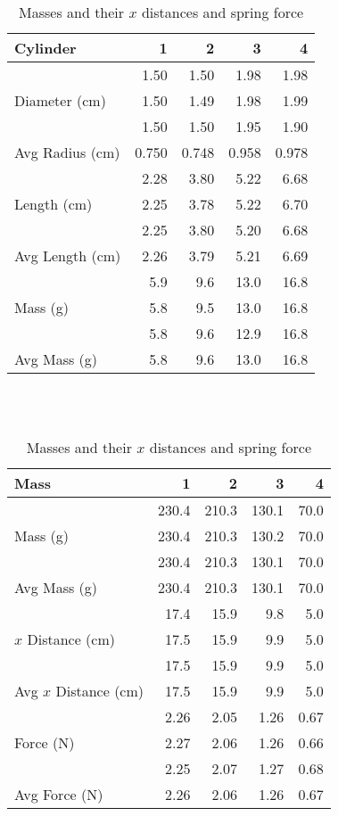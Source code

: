 \documentclass [12pt, letterpaper, twoside] {article}
\begin{document}
\begin{table}[H]
  \centering
  \begin {tabular}{|l | r | r | r | r|}
    \hline\hline
    Cylinder & 1 & 2 & 3 & 4 \\
    \hline
    \multirow {3}{*}{Diameter (cm)} & 1.50 & 1.50 & 1.98 & 1.98 \\
    & 1.50 & 1.49 & 1.98 & 1.99 \\
    & 1.50 & 1.50 & 1.95 & 1.90 \\
    \hline
    Avg Radius (cm) & 0.750 & 0.748 & 0.958 & 0.978 \\
    \hline
    \multirow {3}{*}{Length (cm)} & 2.28 & 3.80 & 5.22 & 6.68 \\
    & 2.25 & 3.78 & 5.22 & 6.70 \\
    & 2.25 & 3.80 & 5.20 & 6.68 \\
    \hline
    Avg Length (cm) & 2.26 & 3.79 & 5.21 & 6.69 \\
    \hline
    \multirow {3}{*}{Mass (g)} & 5.9 & 9.6 & 13.0 & 16.8 \\
    & 5.8 & 9.5 & 13.0 & 16.8 \\
    & 5.8 & 9.6 & 12.9 & 16.8 \\
    \hline
    Avg Mass (g) & 5.8 & 9.6 & 13.0 & 16.8 \\
    \hline\hline
  \end {tabular}
  \caption {Unknown material cylinder dimensions and mass} ~\\~\\

  \begin {tabular}{| l | r | r | r | r |}
    \hline\hline
    Mass & 1 & 2 & 3 & 4 \\
    \hline
    \multirow {3}{*}{Mass (g)} & 230.4 & 210.3 & 130.1 & 70.0 \\
    & 230.4 & 210.3 & 130.2 & 70.0 \\
    & 230.4 & 210.3 & 130.1 & 70.0 \\
    \hline
    Avg Mass (g) & 230.4 & 210.3 & 130.1 & 70.0 \\
    \hline
    \multirow {3}{*}{\(x\) Distance (cm)} & 17.4 & 15.9 & 9.8 & 5.0 \\
    & 17.5 & 15.9 & 9.9 & 5.0 \\
    & 17.5 & 15.9 & 9.9 & 5.0 \\
    \hline
    Avg \(x\) Distance (cm) & 17.5 & 15.9 & 9.9 & 5.0 \\
    \hline
    \multirow {3}{*}{Force (N)} & 2.26 & 2.05 & 1.26 & 0.67 \\
    & 2.27 & 2.06 & 1.26 & 0.66 \\
    & 2.25 & 2.07 & 1.27 & 0.68 \\
    \hline
    Avg Force (N) & 2.26 & 2.06 & 1.26 & 0.67 \\
    \hline\hline
  \end {tabular}
  \caption {Masses and their \(x\) distances and spring force}
\end {table}
\end{document}

